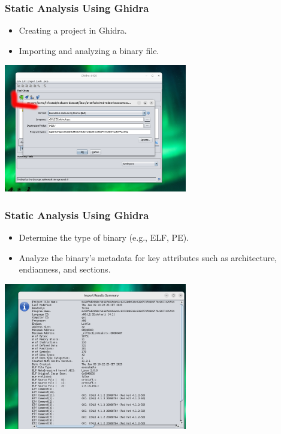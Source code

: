 \begin{frame}
\frametitle{Static Analysis Using Ghidra}
\begin{itemize}
    \item Creating a project in Ghidra.
    \item Importing and analyzing a binary file.
\end{itemize}

\centering
\includegraphics[width=0.6\textwidth]{img/g0.png}

\end{frame}

\begin{frame}
\frametitle{Static Analysis Using Ghidra}

\begin{itemize}
    \item Determine the type of binary (e.g., ELF, PE).
    \item Analyze the binary's metadata for key attributes such as architecture, endianness, and sections.
\end{itemize}

\centering
\includegraphics[width=0.6\textwidth]{img/g1.png}
\end{frame}

